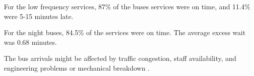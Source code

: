\par For the low frequency services, 87\% of the buses services were on time, and 11.4\% were 5-15 minutes late. 

\par For the night buses, 84.5\% of the services were on time. The average excess wait was 0.68 minutes.

\par The bus arrivals might be affected by traffic congestion, staff availability, and engineering problems or mechanical breakdown \cite{buses_performance_data}.


